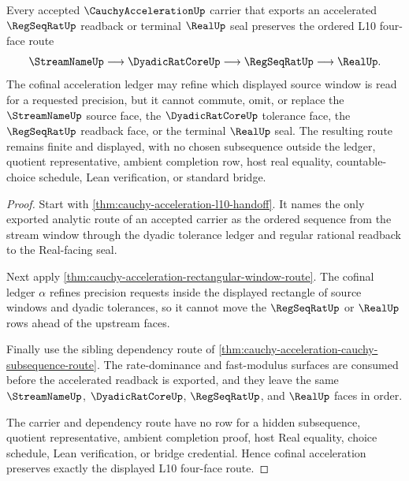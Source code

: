 \begin{theorem}
\label{thm:cauchy-acceleration-l10-four-face-cofinality}
Every accepted $\CauchyAccelerationUp$ carrier that exports an accelerated $\RegSeqRatUp$ readback or terminal $\RealUp$ seal preserves the ordered L10 four-face route
$$
\StreamNameUp \longrightarrow \DyadicRatCoreUp \longrightarrow \RegSeqRatUp \longrightarrow \RealUp .
$$
The cofinal acceleration ledger may refine which displayed source window is read for a requested precision, but it cannot commute, omit, or replace the $\StreamNameUp$ source face, the $\DyadicRatCoreUp$ tolerance face, the $\RegSeqRatUp$ readback face, or the terminal $\RealUp$ seal. The resulting route remains finite and displayed, with no chosen subsequence outside the ledger, quotient representative, ambient completion row, host real equality, countable-choice schedule, Lean verification, or standard bridge.
\end{theorem}
\begin{proof}
Start with \autoref{thm:cauchy-acceleration-l10-handoff}. It names the only exported analytic route of an accepted carrier as the ordered sequence from the stream window through the dyadic tolerance ledger and regular rational readback to the Real-facing seal.

Next apply \autoref{thm:cauchy-acceleration-rectangular-window-route}. The cofinal ledger $\alpha$ refines precision requests inside the displayed rectangle of source windows and dyadic tolerances, so it cannot move the $\RegSeqRatUp$ or $\RealUp$ rows ahead of the upstream faces.

Finally use the sibling dependency route of \autoref{thm:cauchy-acceleration-cauchy-subsequence-route}. The rate-dominance and fast-modulus surfaces are consumed before the accelerated readback is exported, and they leave the same $\StreamNameUp$, $\DyadicRatCoreUp$, $\RegSeqRatUp$, and $\RealUp$ faces in order.

The carrier and dependency route have no row for a hidden subsequence, quotient representative, ambient completion proof, host Real equality, choice schedule, Lean verification, or bridge credential. Hence cofinal acceleration preserves exactly the displayed L10 four-face route.
\end{proof}
